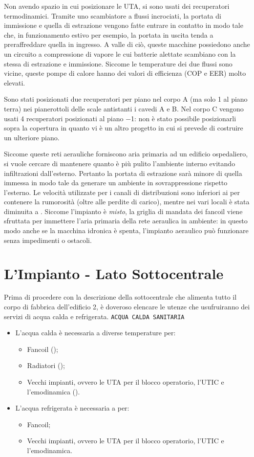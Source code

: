 Non avendo spazio in cui posizionare le UTA, si sono usati dei recuperatori termodinamici. Tramite uno scambiatore a flussi incrociati, la portata di immissione e quella di estrazione vengono fatte entrare in contatto in modo tale che, in funzionamento estivo per esempio, la portata in uscita tenda a preraffreddare quella in ingresso. A valle di ciò, queste macchine possiedono anche un circuito a compressione di vapore le cui batterie alettate scambiano con la stessa di estrazione e immissione. Siccome le temperature dei due flussi sono vicine, queste pompe di calore hanno dei valori di efficienza (COP e EER) molto elevati.

Sono stati posizionati due recuperatori per piano nel corpo A (ma solo \num{1} al piano terra) nei pianerottoli delle scale antistanti i cavedi A e B. Nel corpo C vengono usati 4 recuperatori posizionati al piano \num{-1}: non è stato possibile posizionarli sopra la copertura in quanto vi è un altro progetto in cui si prevede di costruire un ulteriore piano. 

Siccome queste reti aerauliche forniscono aria primaria ad un edificio ospedaliero, si vuole cercare di mantenere quanto è più pulito l'ambiente interno evitando infiltrazioni dall'esterno. Pertanto la portata di estrazione sarà minore di quella immessa in modo tale da generare un ambiente in sovrappressione rispetto l'esterno. Le velocità utilizzate per i canali di distribuzioni sono inferiori ai  per contenere la rumorosità (oltre alle perdite di carico), mentre nei vari locali è stata diminuita a . Siccome l'impianto è \emph{misto}, la griglia di mandata dei fancoil viene sfruttata per immettere l'aria primaria della rete aeraulica in ambiente: in questo modo anche se la macchina idronica è spenta, l'impianto aeraulico può funzionare senza impedimenti o ostacoli.

\section{L'Impianto - Lato Sottocentrale}
Prima di procedere con la descrizione della sottocentrale che alimenta tutto il corpo di fabbrica dell'edificio 2, è doveroso elencare le utenze che usufruiranno dei servizi di acqua calda e refrigerata. \texttt{ACQUA CALDA SANITARIA}
\begin{itemize}
	\item L'acqua calda è necessaria a diverse temperature per:
	\begin{itemize}
		\item Fancoil ();
		\item Radiatori ();
		\item Vecchi impianti, ovvero le UTA per il blocco operatorio, l'UTIC e l'emodinamica ().
	\end{itemize}
	\item L'acqua refrigerata è necessaria a  per:
	\begin{itemize}
		\item Fancoil;
		\item Vecchi impianti, ovvero le UTA per il blocco operatorio, l'UTIC e l'emodinamica.
	\end{itemize}
\end{itemize}
